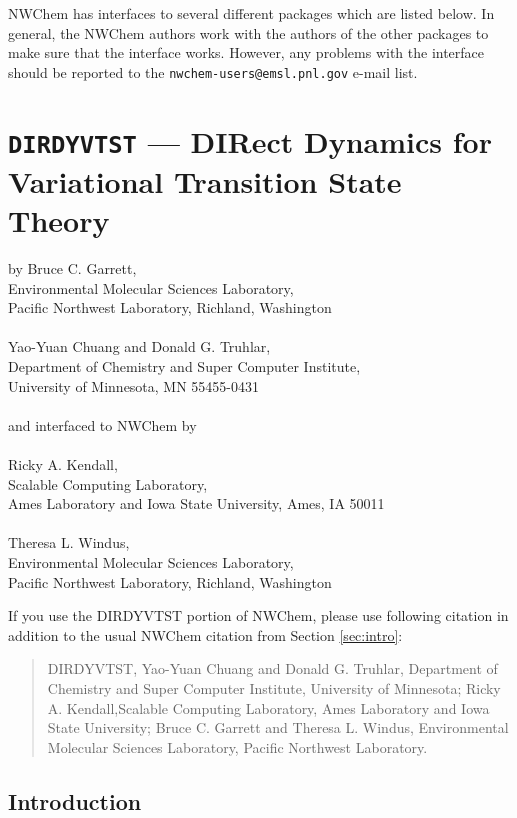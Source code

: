 \label{sec:interface}

NWChem has interfaces to several different packages which are listed below.
In general, the NWChem authors work with the authors of the other packages
to make sure that the interface works.  However, any problems with the 
interface should be reported to the
{\tt nwchem-users@emsl.pnl.gov} e-mail list.


\section{{\tt DIRDYVTST} --- DIRect Dynamics for Variational Transition State Theory}
\label{sec:dirdyvtst}

by Bruce C. Garrett,\\
Environmental Molecular Sciences Laboratory,\\
Pacific Northwest Laboratory, Richland, Washington\\
\\
Yao-Yuan Chuang and Donald G. Truhlar,\\
Department of Chemistry and Super Computer Institute,\\
University of Minnesota, MN 55455-0431\\
\\
and interfaced to NWChem by\\
\\
Ricky A. Kendall,\\
Scalable Computing Laboratory,\\
Ames Laboratory and Iowa State University, Ames, IA 50011\\
\\
Theresa L. Windus,\\
Environmental Molecular Sciences Laboratory,\\
Pacific Northwest Laboratory, Richland, Washington

If you use the DIRDYVTST portion of NWChem, please use following citation
in addition to the usual NWChem citation from Section \ref{sec:intro}:
\begin{quote}
  DIRDYVTST, Yao-Yuan Chuang and Donald G. Truhlar,
  Department of Chemistry and Super Computer Institute,
  University of Minnesota; Ricky A. Kendall,Scalable Computing Laboratory,
  Ames Laboratory and Iowa State University; Bruce C. Garrett and Theresa L.
  Windus, Environmental Molecular Sciences Laboratory, Pacific Northwest
  Laboratory.
\end{quote}

\subsection{Introduction}

